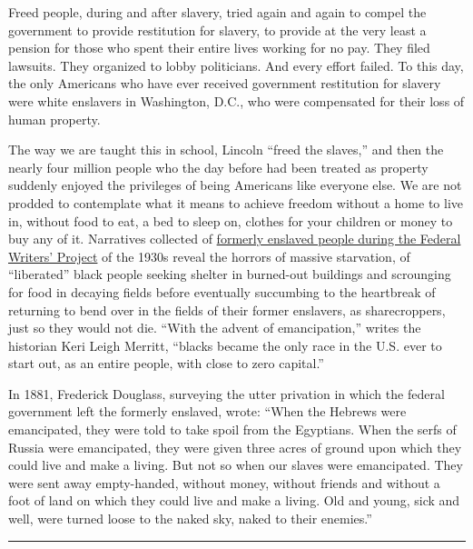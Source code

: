 Freed people, during and after slavery, tried again and again to compel
the government to provide restitution for slavery, to provide at the
very least a pension for those who spent their entire lives working for
no pay. They filed lawsuits. They organized to lobby politicians. And
every effort failed. To this day, the only Americans who have ever
received government restitution for slavery were white enslavers in
Washington, D.C., who were compensated for their loss of human property.

The way we are taught this in school, Lincoln ``freed the slaves,'' and
then the nearly four million people who the day before had been treated
as property suddenly enjoyed the privileges of being Americans like
everyone else. We are not prodded to contemplate what it means to
achieve freedom without a home to live in, without food to eat, a bed to
sleep on, clothes for your children or money to buy any of it.
Narratives collected of
\href{https://www.loc.gov/collections/slave-narratives-from-the-federal-writers-project-1936-to-1938/about-this-collection/}{formerly
enslaved people during the Federal Writers' Project} of the 1930s reveal
the horrors of massive starvation, of ``liberated'' black people seeking
shelter in burned-out buildings and scrounging for food in decaying
fields before eventually succumbing to the heartbreak of returning to
bend over in the fields of their former enslavers, as sharecroppers,
just so they would not die. ``With the advent of emancipation,'' writes
the historian Keri Leigh Merritt, ``blacks became the only race in the
U.S. ever to start out, as an entire people, with close to zero
capital.''

In 1881, Frederick Douglass, surveying the utter privation in which the
federal government left the formerly enslaved, wrote: ``When the Hebrews
were emancipated, they were told to take spoil from the Egyptians. When
the serfs of Russia were emancipated, they were given three acres of
ground upon which they could live and make a living. But not so when our
slaves were emancipated. They were sent away empty-handed, without
money, without friends and without a foot of land on which they could
live and make a living. Old and young, sick and well, were turned loose
to the naked sky, naked to their enemies.''

\begin{center}\rule{0.5\linewidth}{\linethickness}\end{center}

